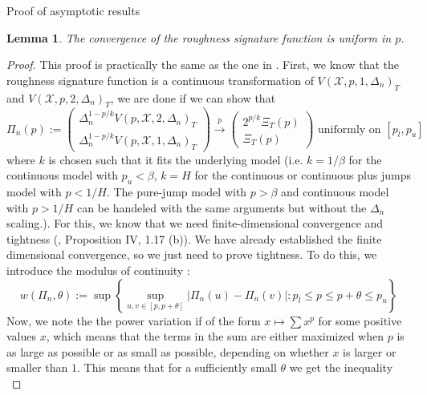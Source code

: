 \documentclass[fleqn,11pt,letterpaper]{article}
\theoremstyle{plain}
\newtheorem{lemma}{Lemma}[section]
\theoremstyle{definition}
\theoremstyle{remark}
\numberwithin{equation}{section}
\begin{document}
\begin{section}{Proof of asymptotic results}
\begin{lemma}
    The convergence of the roughness signature function is uniform in $p$. %
\end{lemma}
\begin{proof}
    This proof is practically the same as the one in \cite{Todorov2010}. First, we know that the roughness signature function is a continuous transformation of $V(\mathcal{X},p,1,\Delta_n)_T$ and $V(\mathcal{X},p,2,\Delta_n)_T$, we are done if we can show that 
    \begin{equation}
        \Pi_n(p):=\left(\begin{array}{c}
        \Delta_n^{1-p / k} V\left(p, \mathcal{X}, 2, \Delta_n\right)_T \\
        \Delta_n^{1-p / k} V\left(p, \mathcal{X}, 1,\Delta_n\right)_T
        \end{array}\right) \stackrel{p}{\longrightarrow}\left(\begin{array}{c}
        2^{p / k} \Xi_T(p) \\
        \Xi_T(p)
        \end{array}\right) \text { uniformly on }\left[p_l, p_u\right]        
    \end{equation}
    where $k$ is chosen such that it fits the underlying model (i.e. $k=1/\beta$ for the continuous model with $p_u<\beta$, $k=H$ for the continuous or continuous plus jumps model with $p<1/H$. The pure-jump model with $p>\beta$ and continuous model with $p>1/H$ can be handeled with the same arguments but without the $\Delta_n$ scaling.). For this, we know that we need finite-dimensional convergence and tightness (\cite{limitTheorems}, Proposition IV, 1.17 (b)). We have already established the finite dimensional convergence, so we just need to prove tightness. To do this, we introduce the modulus of continuity \citep{limitTheorems}:
    \begin{equation}
        w\left(\Pi_n, \theta\right):=\sup \left\{\sup _{u, v \in[p, p+\theta]}\left|\Pi_n(u)-\Pi_n(v)\right|: p_l \leq p \leq p+\theta \leq p_u\right\}
    \end{equation}
    Now, we note the the power variation if of the form $x\mapsto \sum x^p$ for some positive values $x$, which means that the terms in the sum are either maximized when $p$ is as large as possible or as small as possible, depending on whether $x$ is larger or smaller than $1$. This means that for a sufficiently small $\theta$ we get the inequality 
    \begin{equation}

\end{equation}
\end{proof}
\end{section}
\end{document}

